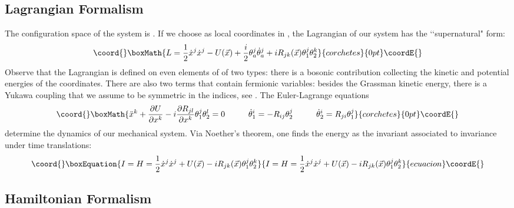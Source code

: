 \documentclass[a4paper,11pt,twoside]{article}
\def\r{\mathbb R}                   %
\begin{document}
\subsection{Lagrangian Formalism}

The configuration space of the system is \myHighlight{${\cal C}={\r}^N \times
(B_{2N})$}\coordHE{}. If we choose \coordHE{} as local
coordinates in \coordHE{}, the Lagrangian of our system has the
\lq\lq supernatural" form:
\[\coord{}\boxMath{
L=\displaystyle\frac{1}{2} \dot{x}^j \dot{x}^j
-U(\vec{x})+\displaystyle\frac{i}{2} \theta^j_a \dot{\theta}^j_a+
i R_{jk}(\vec{x}) \theta^j_1 \theta^k_2
}{corchetes}{0pt}\coordE{}\]
Observe that the Lagrangian is defined on even elements of \coordHE{} of two types: there is a bosonic contribution collecting the
kinetic and potential energies of the \coordHE{} coordinates. There are
also two terms that contain fermionic variables: besides the
Grassman kinetic energy, there is a Yukawa coupling \coordHE{} that
we assume to be symmetric in the \coordHE{} indices, see \cite{Ca}. The
Euler-Lagrange equations
\[\coord{}\boxMath{
\ddot{x}^k+\frac{\partial U}{\partial x^k}-i \frac{\partial
R_{jl}}{\partial x^k} \theta_1^j \theta_2^l=0 \hspace{1cm}
\dot{\theta}_1^i=-R_{ij} \theta_2^j \hspace{1cm}
\dot{\theta}_2^i=R_{ji} \theta_1^j
}{corchetes}{0pt}\coordE{}\]
determine the dynamics of our mechanical system. Via Noether's
theorem, one finds the energy as the invariant associated to
invariance under time translations:
\begin{equation}\coord{}\boxEquation{
I=H=\frac{1}{2} \dot{x}^j \dot{x}^j +U(\vec{x})- i R_{jk}(\vec{x})
\theta^j_1 \theta^k_2
\label{eq:hapseudo}
}{
I=H=\frac{1}{2} \dot{x}^j \dot{x}^j +U(\vec{x})- i R_{jk}(\vec{x})
\theta^j_1 \theta^k_2
}{ecuacion}\coordE{}\end{equation}

\subsection{Hamiltonian Formalism}
\end{document}
